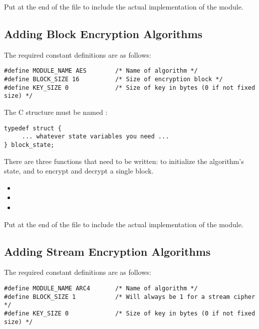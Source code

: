 \documentclass{howto}
\begin{document}
Put  at the end of the file to
include the actual implementation of the module.


\subsection{Adding Block Encryption Algorithms}

The required constant definitions are as follows:

\begin{verbatim}
#define MODULE_NAME AES	       /* Name of algorithm */
#define BLOCK_SIZE 16          /* Size of encryption block */
#define KEY_SIZE 0             /* Size of key in bytes (0 if not fixed size) */
\end{verbatim}

The C structure must be named :

\begin{verbatim}
typedef struct {
     ... whatever state variables you need ...
} block_state;
\end{verbatim}

There are three functions that need to be written: to initialize the
algorithm's state, and to encrypt and decrypt a single block.

\begin{itemize}
  \item {}
  \item {}
  \item {}
\end{itemize}

Put  at the end of the file to
include the actual implementation of the module.


\subsection{Adding Stream Encryption Algorithms}

The required constant definitions are as follows:

\begin{verbatim}
#define MODULE_NAME ARC4       /* Name of algorithm */
#define BLOCK_SIZE 1           /* Will always be 1 for a stream cipher */
#define KEY_SIZE 0             /* Size of key in bytes (0 if not fixed size) */
\end{verbatim}
\end{document}
